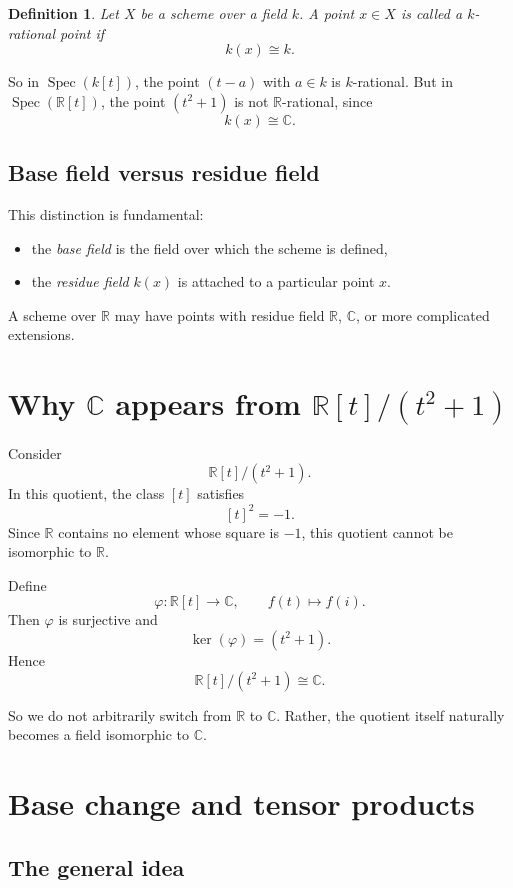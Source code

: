 \documentclass[12pt,a4paper]{article}
\theoremstyle{notespace}
\newtheorem{definition}{Definition}[section]
\newcommand{\Spec}{\operatorname{Spec}}
\newcommand{\R}{\mathbb R}
\newcommand{\C}{\mathbb C}
\theoremstyle{definition}
\begin{document}
	\begin{definition}
		Let \(X\) be a scheme over a field \(k\). A point \(x\in X\) is called a \emph{\(k\)-rational point} if
		\[
		k(x)\cong k.
		\]
	\end{definition}
	
	So in \(\Spec(k[t])\), the point \((t-a)\) with \(a\in k\) is \(k\)-rational.  
	But in \(\Spec(\R[t])\), the point \((t^2+1)\) is not \(\R\)-rational, since
	\[
	k(x)\cong \C.
	\]
	
	\subsection{Base field versus residue field}
	
	This distinction is fundamental:
	
	\begin{itemize}[leftmargin=2em]
		\item the \emph{base field} is the field over which the scheme is defined,
		\item the \emph{residue field} \(k(x)\) is attached to a particular point \(x\).
	\end{itemize}
	
	A scheme over \(\R\) may have points with residue field \(\R\), \(\C\), or more complicated extensions.
	
	\section{Why \(\C\) appears from \(\R[t]/(t^2+1)\)}
	
	Consider
	\[
	\R[t]/(t^2+1).
	\]
	In this quotient, the class \([t]\) satisfies
	\[
	[t]^2=-1.
	\]
	Since \(\R\) contains no element whose square is \(-1\), this quotient cannot be isomorphic to \(\R\).
	
	Define
	\[
	\varphi:\R[t]\longrightarrow \C,
	\qquad
	f(t)\longmapsto f(i).
	\]
	Then \(\varphi\) is surjective and
	\[
	\ker(\varphi)=(t^2+1).
	\]
	Hence
	\[
	\R[t]/(t^2+1)\cong \C.
	\]
	
	So we do not arbitrarily switch from \(\R\) to \(\C\).  
	Rather, the quotient itself naturally becomes a field isomorphic to \(\C\).
	
	\section{Base change and tensor products}
	
	\subsection{The general idea}
	
\end{document}
